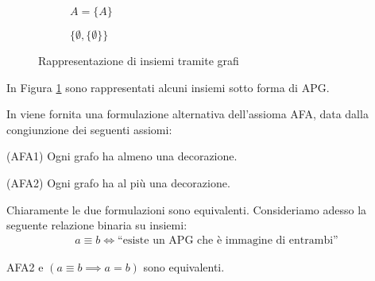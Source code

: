 \begin{example}
\begin{figure}[b]
\begin{subfigure}{.15\textwidth}
          \captionsetup{labelformat=empty}
          \caption{$A = \{A\}$}
        \end{subfigure}
        \begin{subfigure}{.25\textwidth}
            \centering
            \captionsetup{labelformat=empty}
            \caption{$\{\emptyset, \{\emptyset\}\}$}
          \end{subfigure}

        \caption{Rappresentazione di insiemi tramite grafi}
        \label{fig:graph_set}
    \end{figure}
    In Figura \ref*{fig:graph_set} sono rappresentati alcuni insiemi sotto forma di APG.
\end{example}
In \cite{aczel} viene fornita una formulazione alternativa dell'assioma AFA, data dalla congiunzione dei seguenti assiomi:
\begin{axiom}(AFA1)
    Ogni grafo ha almeno una decorazione.
\end{axiom}
\begin{axiom}(AFA2)
    Ogni grafo ha al più una decorazione.
\end{axiom}
Chiaramente le due formulazioni sono equivalenti. Consideriamo adesso la seguente relazione binaria su insiemi:
\begin{gather*}
    a \equiv b \iff \text{``esiste un APG che è immagine di entrambi''}
\end{gather*}
\begin{proposition}
    AFA2 e $(a \equiv b \implies a = b)$ sono equivalenti.
\end{proposition}
